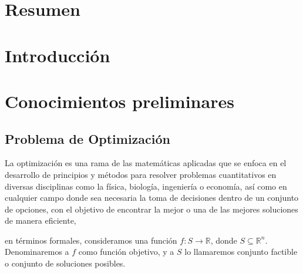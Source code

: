 \documentclass[12pt,titlepage,twoside,openright]{book}
\begin{document}
\frontmatter{}



\pagestyle{plain}


\tableofcontents
\newpage
\listoffigures




\mainmatter{}
\pagestyle{fancy}
\renewcommand{\chaptermark}[1]{%
	\markboth{\chaptername
		\ \thechapter.\ #1}{}}
\fancyhead[RO,LE]{\bfseries \thepage}
\fancyfoot{}
\setlength{\parindent}{0pt}
\setlength{\parskip}{1.5ex}



\chapter{Resumen}



\chapter{Introducción}
\chapter{Conocimientos preliminares}
\section{Problema de Optimización}

La optimización es una rama de las matemáticas aplicadas que se enfoca en el desarrollo de principios y métodos para resolver problemas cuantitativos en diversas disciplinas como la f\'isica, biolog\'ia, ingenier\'ia o econom\'ia, as\'i como en cualquier campo donde sea necesaria la toma de decisiones dentro de un conjunto de opciones, con el objetivo de encontrar la mejor o una de las mejores soluciones de manera eficiente,

en términos formales, consideramos una función \( f : S \rightarrow \mathbb{R} \), donde \( S \subseteq \mathbb{R}^n \). Denominaremos a \( f \) como funci\'on objetivo, y a \( S \) lo llamaremos conjunto factible o conjunto de soluciones posibles.
\end{document}
